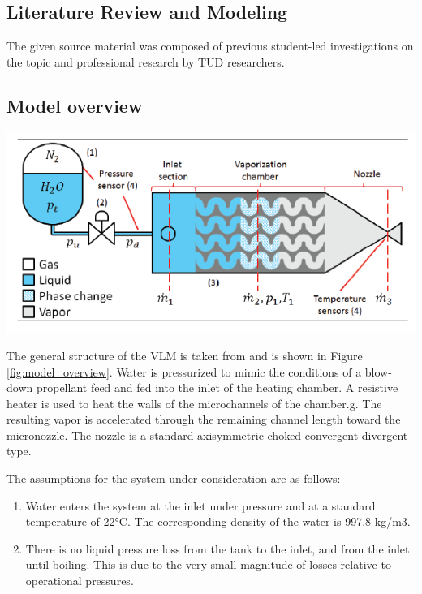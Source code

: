 \documentclass{homework}
\begin{document}
\begin{multicols}{2}
\section{Literature Review and Modeling}

The given source material was composed of previous student-led investigations on the topic and professional research by TUD researchers.

\subsection{Model overview}

\begin{minipage}{\linewidth}
      \centering
      \includegraphics[width=\linewidth]{images/overview.png}
      \label{fig:model_overview}
  \end{minipage} 

The general structure of the VLM is taken from \cite{silva_comprehensive_2019} and is shown in Figure \ref{fig:model_overview}. Water is pressurized to mimic the conditions of a blow-down propellant feed and fed into the inlet of the heating chamber. A resistive heater is used to heat the walls of the microchannels of the chamber.g. The resulting vapor is accelerated through the remaining channel length toward the micronozzle. The nozzle is a standard axisymmetric choked convergent-divergent type.


The assumptions for the system under consideration are as follows:

\begin{enumerate}
    \item Water enters the system at the inlet under pressure and at a standard temperature of 22°C. The corresponding density of the water is 997.8 kg/m3.
    
    \item There is no liquid pressure loss from the tank to the inlet, and from the inlet until boiling. This is due to the very small magnitude of losses relative to operational pressures.
    

\end{enumerate}
\end{multicols}
\end{document}
